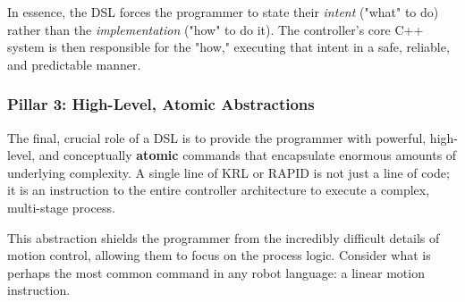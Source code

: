 In essence, the DSL forces the programmer to state their \textit{intent} ("what" to do) rather than the \textit{implementation} ("how" to do it). The controller's core C++ system is then responsible for the "how," executing that intent in a safe, reliable, and predictable manner.



\subsubsection{Pillar 3: High-Level, Atomic Abstractions}
\label{subsubsec:dsl_abstractions}

The final, crucial role of a DSL is to provide the programmer with powerful, high-level, and conceptually \textbf{atomic} commands that encapsulate enormous amounts of underlying complexity. A single line of KRL or RAPID is not just a line of code; it is an instruction to the entire controller architecture to execute a complex, multi-stage process.

This abstraction shields the programmer from the incredibly difficult details of motion control, allowing them to focus on the process logic. Consider what is perhaps the most common command in any robot language: a linear motion instruction.

